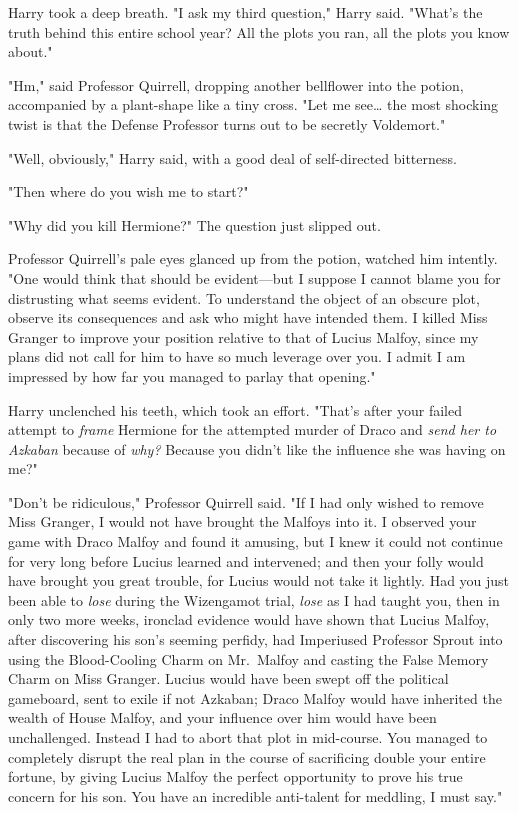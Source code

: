 Harry took a deep breath. "I ask my third question," Harry said. "What's the
truth behind this entire school year? All the plots you ran, all the plots you
know about."

"Hm," said Professor Quirrell, dropping another bellflower into the potion,
accompanied by a plant-shape like a tiny cross. "Let me see{\ldots} the most
shocking twist is that the Defense Professor turns out to be secretly
Voldemort."

"Well, obviously," Harry said, with a good deal of self-directed bitterness.

"Then where do you wish me to start?"

"Why did you kill Hermione?" The question just slipped out.

Professor Quirrell's pale eyes glanced up from the potion, watched him
intently. "One would think that should be evident---but I suppose I cannot
blame you for distrusting what seems evident. To understand the object of an
obscure plot, observe its consequences and ask who might have intended them. I
killed Miss Granger to improve your position relative to that of Lucius Malfoy,
since my plans did not call for him to have so much leverage over you. I admit
I am impressed by how far you managed to parlay that opening."

Harry unclenched his teeth, which took an effort. "That's after your failed
attempt to \emph{frame} Hermione for the attempted murder of Draco and
\emph{send her to Azkaban} because of \emph{why?} Because you didn't like the
influence she was having on me?"

"Don't be ridiculous," Professor Quirrell said. "If I had only wished to remove
Miss Granger, I would not have brought the Malfoys into it. I observed your
game with Draco Malfoy and found it amusing, but I knew it could not continue
for very long before Lucius learned and intervened; and then your folly would
have brought you great trouble, for Lucius would not take it lightly. Had you
just been able to \emph{lose} during the Wizengamot trial, \emph{lose} as I had
taught you, then in only two more weeks, ironclad evidence would have shown
that Lucius Malfoy, after discovering his son's seeming perfidy, had Imperiused
Professor Sprout into using the Blood-Cooling Charm on Mr.~Malfoy and casting
the False Memory Charm on Miss Granger. Lucius would have been swept off the
political gameboard, sent to exile if not Azkaban; Draco Malfoy would have
inherited the wealth of House Malfoy, and your influence over him would have
been unchallenged. Instead I had to abort that plot in mid-course. You managed
to completely disrupt the real plan in the course of sacrificing double your
entire fortune, by giving Lucius Malfoy the perfect opportunity to prove his
true concern for his son. You have an incredible anti-talent for meddling, I
must say."

